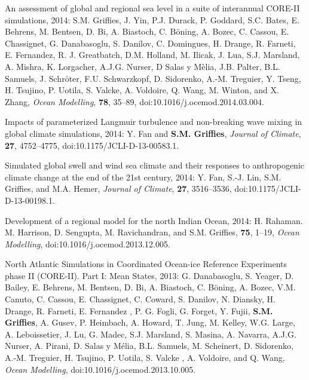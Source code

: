 \begin{etaremune}
\item An assessment of global and regional sea level in a suite of
  interannual CORE-II simulations, 2014: S.M. Grif\/f\/ies,
  J. Yin, P.J. Durack, P. Goddard, S.C. Bates, E. Behrens, M. Bentsen,
  D. Bi, A. Biastoch, C. B\"oning, A. Bozec, C. Cassou, E. Chassignet,
  G. Danabasoglu, S. Danilov, C. Domingues, H. Drange, R. Farneti,
  E. Fernandez, R. J. Greatbatch, D.M. Holland, M. Ilicak, J. Lua,
  S.J. Marsland, A. Mishra, K. Lorgacher, A.J.G. Nurser, D Salas y
  M\`elia, J.B.  Palter, B.L. Samuels, J. Schr\"oter, F.U. Schwarzkopf, D. Sidorenko, A.-M. Treguier, Y. Tseng,
  H. Tsujino, P. Uotila, S. Valcke, A. Voldoire, Q. Wang, M. Winton,
  and X. Zhang, {\it Ocean Modelling}, {\bf 78}, 35--89,
  doi:10.1016/j.ocemod.2014.03.004.

\item Impacts of parameterized Langmuir turbulence and non-breaking
  wave mixing in global climate simulations, 2014: Y. Fan and {\bf
    S.M. Grif\/f\/ies}, {\it Journal of Climate}, {\bf 27},
  4752--4775, doi:10.1175/JCLI-D-13-00583.1.

\item Simulated global swell and wind sea climate and their responses
  to anthropogenic climate change at the end of the 21st century,
  2014: Y. Fan, S.-J. Lin, S.M. Grif\/f\/ies, and M.A. Hemer,
  {\it Journal of Climate}, {\bf 27}, 3516--3536,
  doi:10.1175/JCLI-D-13-00198.1.

\item Development of a regional model for the north Indian Ocean,
  2014: H. Rahaman. M. Harrison, D. Sengupta, M.  Ravichandran, and
  S.M. Grif\/f\/ies, {\bf 75}, 1--19, {\it Ocean Modelling},
  doi:10.1016/j.ocemod.2013.12.005.

\item North Atlantic Simulations in Coordinated Ocean-ice Reference
  Experiments phase II (CORE-II). Part I: Mean States, 2013: G.
  Danabasoglu, S. Yeager, D. Bailey, E. Behrens, M. Bentsen, D. Bi,
  A. Biastoch, C. {B\"{o}ning}, A. Bozec, V.M. Canuto, C. Cassou,
  E. Chassignet, C. Coward, S. Danilov, N. Diansky, H. Drange,
  R. Farneti, E. Fernandez , P. G. Fogli, G. Forget, Y. Fujii, {\bf
    S.M. Grif\/f\/ies}, A.  Gusev, P. Heimbach, A.  Howard, T. Jung,
  M. Kelley, W.G. Large, A. Leboissetier, J. Lu, G. Madec,
  S.J. Marsland, S. Masina, A. Navarra, A.J.G. Nurser, A. Pirani,
  D. Salas y {M\'{e}lia}, B.L. Samuels, M. Scheinert, D. Sidorenko,
  A.-M. Treguier, H. Tsujino, P.   Uotila, S. Valcke , A. Voldoire, and
  Q. Wang, {\it Ocean Modelling}, doi:10.1016/j.ocemod.2013.10.005.


\end{etaremune}
